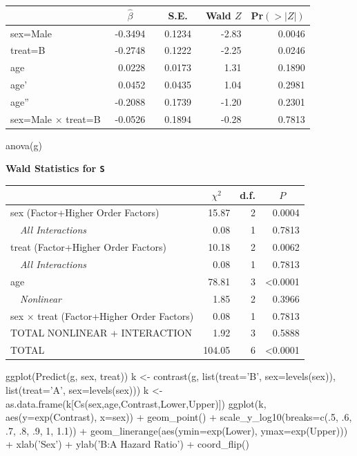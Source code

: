  \setlongtables\begin{longtable}{lrrrr}\hline
 \multicolumn{1}{l}{}&\multicolumn{1}{c}{$\hat{\beta}$}&\multicolumn{1}{c}{S.E.}&\multicolumn{1}{c}{Wald $Z$}&\multicolumn{1}{c}{Pr$(>|Z|)$}\tabularnewline
 \hline
 \endhead
 \hline
 \endfoot
 sex=Male&~-0.3494~&~0.1234~&-2.83&0.0046\tabularnewline
 treat=B&~-0.2748~&~0.1222~&-2.25&0.0246\tabularnewline
 age&~ 0.0228~&~0.0173~& 1.31&0.1890\tabularnewline
 age'&~ 0.0452~&~0.0435~& 1.04&0.2981\tabularnewline
 age''&~-0.2088~&~0.1739~&-1.20&0.2301\tabularnewline
 sex=Male $\times$ treat=B&~-0.0526~&~0.1894~&-0.28&0.7813\tabularnewline
 \hline
 \end{longtable}
 \addtocounter{table}{-1}
\begin{Sinput}
anova(g)
\end{Sinput}
\textbf{\Needspace{2in}
Wald Statistics for \texttt{\smaller S}}\begin{center}
\begin{tabular}{lrrr}
\hline\hline
\multicolumn{1}{l}{}&\multicolumn{1}{c}{$\chi^{2}$}&\multicolumn{1}{c}{d.f.}&\multicolumn{1}{c}{$P$}\tabularnewline
\hline
sex  (Factor+Higher Order Factors)& 15.87&2&0.0004\tabularnewline
~~\emph{All Interactions}&  0.08&1&0.7813\tabularnewline
treat  (Factor+Higher Order Factors)& 10.18&2&0.0062\tabularnewline
~~\emph{All Interactions}&  0.08&1&0.7813\tabularnewline
age& 78.81&3&\textless 0.0001\tabularnewline
~~\emph{Nonlinear}&  1.85&2&0.3966\tabularnewline
sex $\times$ treat  (Factor+Higher Order Factors)&  0.08&1&0.7813\tabularnewline
TOTAL NONLINEAR + INTERACTION&  1.92&3&0.5888\tabularnewline
TOTAL&104.05&6&\textless 0.0001\tabularnewline
\hline
\end{tabular}\end{center}
\begin{Sinput}
ggplot(Predict(g, sex, treat))
k <- contrast(g, list(treat='B', sex=levels(sex)), list(treat='A', sex=levels(sex)))
k <- as.data.frame(k[Cs(sex,age,Contrast,Lower,Upper)])
ggplot(k, aes(y=exp(Contrast), x=sex)) + geom_point() +
  scale_y_log10(breaks=c(.5, .6, .7, .8, .9, 1, 1.1)) +
  geom_linerange(aes(ymin=exp(Lower), ymax=exp(Upper))) + 
  xlab('Sex') + ylab('B:A Hazard Ratio') + coord_flip()
\end{Sinput}



